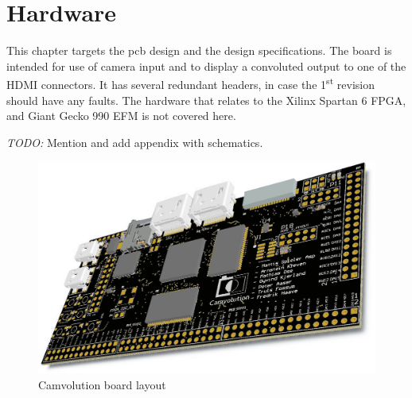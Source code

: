 \section{Hardware}
This chapter targets the pcb design and the design specifications. The board is intended for use of camera input and to display a convoluted output to one of the HDMI connectors. It has several redundant headers, in case the 1\textsuperscript{st} revision should have any faults. The hardware that relates to the Xilinx Spartan 6 FPGA, and Giant Gecko 990 EFM is not covered here.

\emph{TODO:} Mention and add appendix with schematics.

\begin{figure}
    \includegraphics[width=\linewidth]{img/OverviewCamvolutionKit}
    \caption{Camvolution board layout}
\end{figure}

